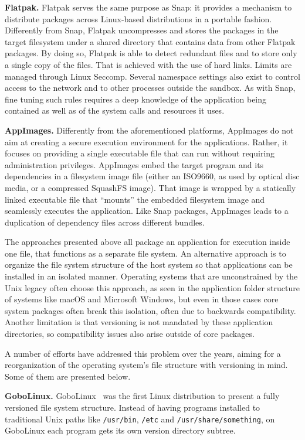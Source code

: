 \documentclass[sigplan, anonymous, 10pt]{acmart}
\begin{document}
\textbf{Flatpak.}
Flatpak serves the same purpose as Snap: it provides a mechanism to distribute packages
across Linux-based distributions in a portable fashion. Differently from Snap, Flatpak
uncompresses and stores the packages in the target filesystem under a shared directory
that contains data from other Flatpak packages. By doing so, Flatpak is able to detect
redundant files and to store only a single copy of the files. That is achieved with the
use of hard links. Limits are managed through Linux Seccomp.
Several namespace settings also exist to control access to the network and to other
processes outside the sandbox. As with Snap, fine tuning such rules requires a deep
knowledge of the application being contained as well as of the system calls and resources
it uses.

\textbf{AppImages.}
Differently from the aforementioned platforms, AppImages do not aim at creating a
secure execution environment for the applications. Rather, it focuses on providing
a single executable file that can run without requiring administration privileges.
AppImages embed the target program and its dependencies in a filesystem image file
(either an ISO9660, as used by optical disc media, or a compressed SquashFS image).
That image is wrapped by a statically linked executable file that ``mounts'' the
embedded filesystem image and seamlessly executes the application. Like Snap
packages, AppImages leads to a duplication of dependency files across different
bundles.

The approaches presented above all package an application for execution inside one file,
that functions as a separate file system. An alternative approach is to organize the
file system structure of the host system so that applications can be installed in an
isolated manner. Operating systems that are unconstrained by the Unix legacy often
choose this approach, as seen in the application folder structure of systems like
macOS and Microsoft Windows, but even in those cases core system packages often
break this isolation, often due to backwards compatibility. Another limitation is that
versioning is not mandated by these application directories, so compatibility issues
also arise outside of core packages.

A number of efforts have addressed this problem over the years, aiming for a reorganization
of the operating system's file structure with versioning in mind. Some of them are presented below.

\textbf{GoboLinux.}
GoboLinux~\cite{GoboLinux} was the first Linux distribution to present a fully versioned
file system structure. Instead of having programs installed to traditional Unix paths
like \texttt{/usr/bin}, \texttt{/etc} and \texttt{/usr/share/something}, on GoboLinux
each program gets its own version directory subtree.
\end{document}
